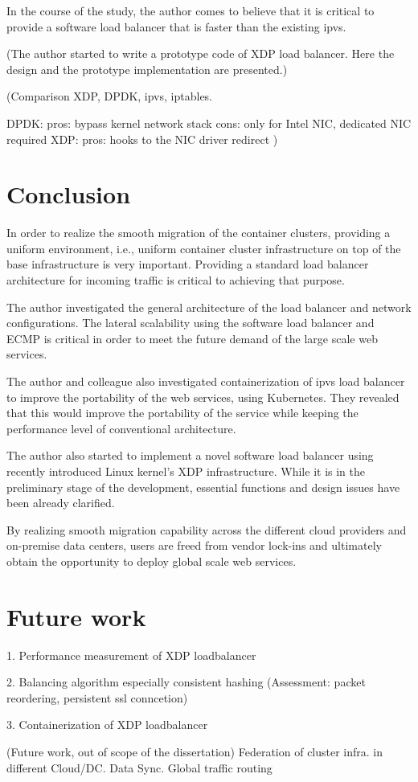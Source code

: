 In the course of the study, the author comes to believe that it is critical to provide a software load balancer that is faster than the existing ipvs.

(The author started to write a prototype code of XDP load balancer.
Here the design and the prototype implementation are presented.)

(Comparison XDP, DPDK, ipvs, iptables.

DPDK: pros: bypass kernel network stack cons: only for Intel NIC, dedicated NIC required
XDP: pros: hooks to the NIC driver redirect
)

\section{Conclusion}\label{Conclusion}

In order to realize the smooth migration of the container clusters, providing a uniform environment, i.e., uniform container cluster infrastructure on top of the base infrastructure is very important.
Providing a standard load balancer architecture for incoming traffic is critical to achieving that purpose.

The author investigated the general architecture of the load balancer and network configurations.
The lateral scalability using the software load balancer and ECMP is critical in order to meet the future demand of the large scale web services.

The author and colleague also investigated containerization of ipvs load balancer to improve the portability of the web services, using Kubernetes.
They revealed that this would improve the portability of the service while keeping the performance level of conventional architecture.

The author also started to implement a novel software load balancer using recently introduced Linux kernel's XDP infrastructure. While it is in the preliminary stage of the development, essential functions and design issues have been already clarified.

By realizing smooth migration capability across the different cloud providers and on-premise data centers, users are freed from vendor lock-ins and ultimately obtain the opportunity to deploy global scale web services.


\section{Future work}\label{Future work}

1. Performance measurement of XDP loadbalancer

2. Balancing algorithm especially consistent hashing
(Assessment: packet reordering, persistent ssl conncetion)
 
3. Containerization of XDP loadbalancer


(Future work, out of scope of the dissertation)
Federation of cluster infra. in different Cloud/DC.
Data Sync.
Global traffic routing

